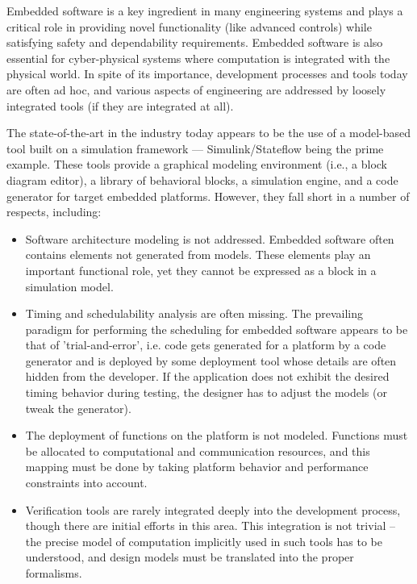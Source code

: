
Embedded software is a key ingredient in many engineering systems and plays a critical role in providing novel functionality (like advanced controls) while satisfying safety and dependability requirements. Embedded software is also essential for cyber-physical systems where computation is integrated with the physical world. In spite of its importance, development processes and tools today are often ad hoc, and various aspects of engineering are addressed by loosely integrated tools (if they are integrated at all).

The state-of-the-art in the industry today appears to be the use of a model-based tool built on a simulation framework --- Simulink/Stateflow\cite{mathworks:tools} being the prime example. These tools provide a graphical modeling environment (i.e., a block diagram editor), a library of behavioral blocks, a simulation engine, and a code generator for target embedded platforms. However, they fall short in a number of respects, including:

\begin{itemize} 
\item Software architecture modeling is not addressed. Embedded software often contains elements not generated from models. These elements play an important functional role, yet they cannot be expressed as a block in a simulation model. 
\item Timing and schedulability analysis are often missing. The prevailing paradigm for performing the scheduling for embedded software appears to be that of 'trial-and-error', i.e. code gets generated for a platform by a code generator and is deployed by some deployment tool whose details are often hidden from the developer. If the application does not exhibit the desired timing behavior during testing, the designer has to adjust the models (or tweak the generator). 
\item The deployment of functions on the platform is not modeled. Functions must be allocated to computational and communication resources, and this mapping must be done by taking platform behavior and performance constraints into account. 
\item Verification tools are rarely integrated deeply into the development process, though there are initial efforts in this area. This integration is not trivial -- the precise model of computation implicitly used in such tools has to be understood, and design models must be translated into the proper formalisms.
\end{itemize}


